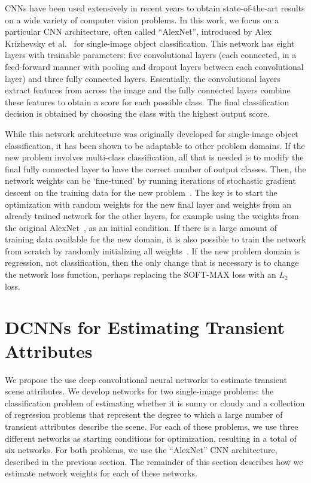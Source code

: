\documentclass[10pt,twocolumn,letterpaper]{article}
\begin{document}
CNNs have been used extensively in recent
years to obtain state-of-the-art results on a wide variety of computer vision
problems.  In this work, we focus on a particular CNN architecture, often
called ``AlexNet'', introduced by Alex Krizhevsky et al.~\cite{caffenetnips12}
for single-image object classification. This network has eight layers with
trainable parameters: five convolutional layers (each connected, in a
feed-forward manner with pooling and dropout layers between each convolutional
layer) and three fully connected layers. Essentially, the convolutional layers
extract features from across the image and the fully connected layers combine
these features to obtain a score for each possible class. The final
classification decision is obtained by choosing the class with the highest
output score.

While this network architecture was originally developed for single-image
object classification, it has been shown to be adaptable to other problem
domains. If the new problem involves multi-class classification, all that is
needed is to modify the final fully connected layer to have the correct number
of output classes. Then, the network weights can be `fine-tuned' by running
iterations of stochastic gradient descent on the training data for the new
problem~\cite{yosinski2014transferable}.  The key is to start the optimization
with random weights for the new final layer and weights from an already trained
network for the other layers, for example using the weights from the original
AlexNet~\cite{caffenetnips12}, as an initial condition. If there is a large
amount of training data available for the new domain, it is also possible to
train the network from scratch by randomly initializing all
weights~\cite{zhou2014places}.  If the new problem domain is regression, not
classification, then the only change that is necessary is to change the network
loss function, perhaps replacing the SOFT-MAX loss with an $L_2$ loss.

\section{DCNNs for Estimating Transient Attributes}
\indent
We propose the use deep convolutional neural networks to estimate transient
scene attributes. We develop networks for two single-image problems: the
classification problem of estimating whether it is sunny or cloudy and a
collection of regression problems that represent the degree to which a large
number of transient attributes describe the scene.  For each of these problems,
we use three different networks as starting conditions for optimization,
resulting in a total of six networks.  For both problems, we use the
``AlexNet'' CNN architecture, described in the previous section.  The remainder
of this section describes how we estimate network weights for each of these
networks.
\end{document}
